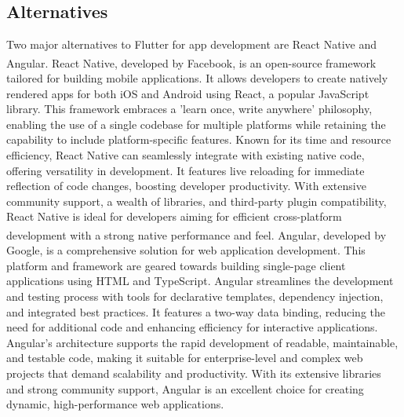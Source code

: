 \subsection{Alternatives}
Two major alternatives to Flutter for app development are React Native and Angular.
\newline\newline
React Native\textsuperscript{\cite{tech_16}}, developed by Facebook, is an open-source framework
tailored for building mobile applications. It allows developers to create natively rendered apps for
both iOS and Android using React, a popular JavaScript library. This framework embraces a 'learn
once, write anywhere' philosophy, enabling the use of a single codebase for multiple platforms while
retaining the capability to include platform-specific features. Known for its time and resource
efficiency, React Native can seamlessly integrate with existing native code, offering versatility in
development. It features live reloading for immediate reflection of code changes, boosting developer
productivity. With extensive community support, a wealth of libraries, and third-party plugin
compatibility, React Native is ideal for developers aiming for efficient cross-platform development
with a strong native performance and feel.
\newline\newline
Angular\textsuperscript{\cite{tech_17}}, developed by Google, is a comprehensive solution for web
application development. This platform and framework are geared towards building single-page client
applications using HTML and TypeScript. Angular streamlines the development and testing process with
tools for declarative templates, dependency injection, and integrated best practices. It features a
two-way data binding, reducing the need for additional code and enhancing efficiency for interactive
applications. Angular's architecture supports the rapid development of readable, maintainable, and
testable code, making it suitable for enterprise-level and complex web projects that demand
scalability and productivity. With its extensive libraries and strong community support, Angular is
an excellent choice for creating dynamic, high-performance web applications.

